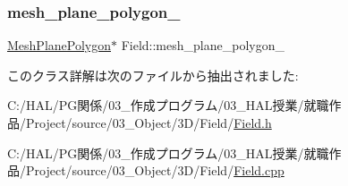 \subsubsection{\texorpdfstring{mesh\+\_\+plane\+\_\+polygon\+\_\+}{mesh\_plane\_polygon\_}}
{\footnotesize\ttfamily \mbox{\hyperlink{class_mesh_plane_polygon}{Mesh\+Plane\+Polygon}}$\ast$ Field\+::mesh\+\_\+plane\+\_\+polygon\+\_\+}



このクラス詳解は次のファイルから抽出されました\+:\begin{DoxyCompactItemize}
\item 
C\+:/\+H\+A\+L/\+P\+G関係/03\+\_\+作成プログラム/03\+\_\+\+H\+A\+L授業/就職作品/\+Project/source/03\+\_\+\+Object/3\+D/\+Field/\mbox{\hyperlink{_field_8h}{Field.\+h}}\item 
C\+:/\+H\+A\+L/\+P\+G関係/03\+\_\+作成プログラム/03\+\_\+\+H\+A\+L授業/就職作品/\+Project/source/03\+\_\+\+Object/3\+D/\+Field/\mbox{\hyperlink{_field_8cpp}{Field.\+cpp}}\end{DoxyCompactItemize}
